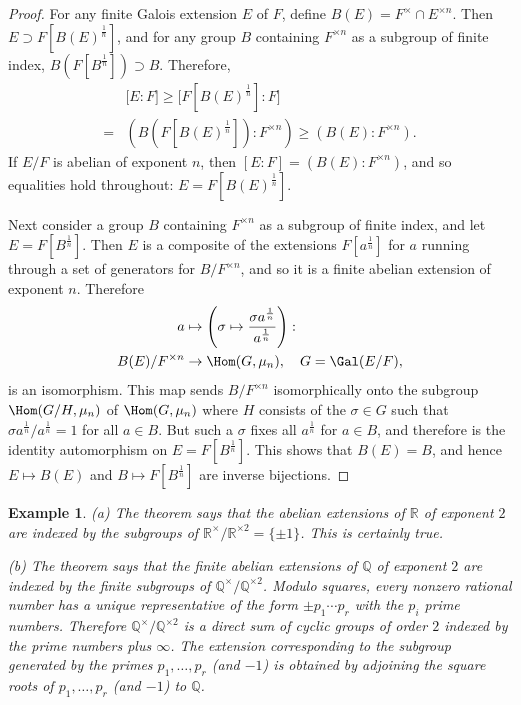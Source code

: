 \documentclass[a4paper,11pt,final,openany]{memoir}
\newtheorem{example}[X]{Example}
\theoremstyle{nonumberplain}
\newtheorem{proof}{Proof.}
\begin{document}
\begin{proof}
For any finite Galois extension $E$ of $F$, define $B(E)=F^{\times}\cap
E^{\times n}$. Then $E\supset F[B(E)^{\frac{1}{n}}]$, and for any group $B$
containing $F^{\times n}$ as a subgroup of finite index, $B(F[B^{\frac{1}{n}%
}])\supset B$. Therefore,
\begin{align*}
&\lbrack E\colon F]\geq\lbrack F[B(E)^{\frac{1}{n}}]\colon F]\\
=&(B(F[B(E)^{\frac
{1}{n}}])\colon F^{\times n})\geq(B(E)\colon F^{\times n}).
\end{align*}
If $E/F$ is abelian of exponent $n$, then $[E\colon F]=(B(E)\colon F^{\times
n})$, and so equalities hold throughout: $E=F[B(E)^{\frac{1}{n}}]$.

Next consider a group $B$ containing $F^{\times n}$ as a subgroup of finite
index, and let $E=F[B^{\frac{1}{n}}]$. Then $E$ is a composite of the
extensions $F[a^{\frac{1}{n}}]$ for $a$ running through a set of generators
for $B/F^{\times n}$, and so it is a finite abelian extension of exponent $n$.
Therefore
\begin{align*}
a&\mapsto\left(  \sigma\mapsto\frac{\sigma a^{\frac{1}{n}}}{a^{\frac{1}{n}}%
}\right)  \colon\\
 B(E)/F^{\times n}&\rightarrow\Hom(G,\mu_{n}),\quad
G=\Gal(E/F),
\end{align*}
is an isomorphism. This map sends $B/F^{\times n}$ isomorphically onto the
subgroup $\Hom(G/H,\mu_{n})$ of $\Hom(G,\mu_{n})$ where $H$ consists of the
$\sigma\in G$ such that $\sigma a^{\frac{1}{n}}/a^{\frac{1}{n}}=1$ for all
$a\in B$. But such a $\sigma$ fixes all $a^{\frac{1}{n}}$ for $a\in B$, and
therefore is the identity automorphism on $E=F[B^{\frac{1}{n}}]$. This shows
that $B(E)=B$, and hence $E\mapsto B(E)$ and $B\mapsto F[B^{\frac{1}{n}}]$ are
inverse bijections.
\end{proof}

\begin{example}
\label{ag20b}(a) The theorem says that the abelian extensions of $\mathbb{R}$
of exponent $2$ are indexed by the subgroups of $\mathbb{R}^{\times
}/\mathbb{R}^{\times2}=\{\pm1\}$. This is certainly true.

(b) The theorem says that the finite abelian extensions of $\mathbb{Q}$ of
exponent $2$ are indexed by the finite subgroups of $\mathbb{Q}^{\times
}/\mathbb{Q}^{\times2}$. Modulo squares, every nonzero rational number has a
unique representative of the form $\pm p_{1}\cdots p_{r}$ with the $p_{i}$
prime numbers. Therefore $\mathbb{Q}^{\times}/\mathbb{Q}^{\times2}$ is a
direct sum of cyclic groups of order $2$ indexed by the prime numbers plus
$\infty$. The extension corresponding to the subgroup generated by the primes
$p_{1},\ldots,p_{r}$ (and $-1$) is obtained by adjoining the square roots of
$p_{1},\ldots,p_{r}$ (and $-1$) to $\mathbb{Q}{}$.
\end{example}
\end{document}
